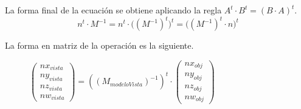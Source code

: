 \newpage
La forma final de la ecuación se obtiene aplicando la regla $A^t \cdot B^t = (B \cdot A)^t$.
\begin{equation*}
  n^t \cdot M^{-1} = n^t \cdot \Big((M^{-1})^t\Big)^t = \Big((M^{-1})^t\cdot n\Big)^t
  \end{equation*}

La forma en matriz de la operación es la siguiente.

\begin{figure}[ht!]
  \centering
  \(
  \begin{pmatrix}
    nx_{vista}\\ny_{vista}\\nz_{vista}\\nw_{vista}
  \end{pmatrix}
  = ((M_{modeloVista})^{-1})^t \cdot
  \begin{pmatrix}
    nx_{obj}\\ny_{obj}\\nz_{obj}\\nw_{obj}
  \end{pmatrix}
  \)
\end{figure}

